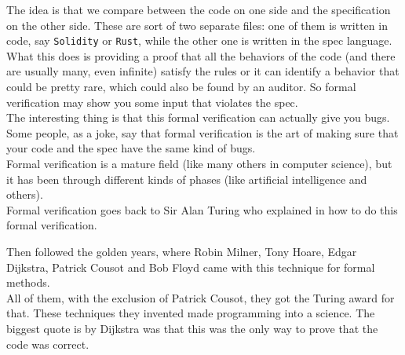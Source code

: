 \documentclass[oneside]{book}
\begin{document}
    The idea is that we compare between the code on one side and the specification on the other side.
    These are sort of two separate files: one of them is written in code, say \texttt{Solidity} or \texttt{Rust}, while the other one is written in the spec language.\\

   What this does is providing a proof that all the behaviors of the code (and there are usually many, even infinite) satisfy the rules or it can identify a behavior that could be pretty rare, which could also be found by an auditor.
    So formal verification may show you some input that violates the spec.\\

    The interesting thing is that this formal verification can actually give you bugs.
    Some people, as a joke, say that formal verification is the art of making sure that your code and the spec have the same kind of bugs.\\

    Formal verification is a mature field (like many others in computer science), but it has been through different kinds of phases (like artificial intelligence and others).\\

    Formal verification goes back to Sir Alan Turing who explained in how to do this formal verification.

    Then followed the golden years, where Robin Milner, Tony Hoare, Edgar Dijkstra, Patrick Cousot and Bob Floyd came with this technique for formal methods.\\

    All of them, with the exclusion of Patrick Cousot, they got the Turing award for that.
    These techniques they invented made programming into a science.
    The biggest quote is by Dijkstra was that this was the only way to prove that the code was correct.

    \pagebreak
\end{document}
